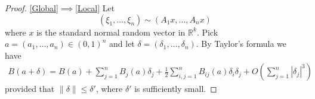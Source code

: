 \documentclass[9pt, a4paper]{amsart}
\newcommand{\R}{\mathbb{R}}
\newcommand{\1}{{\chi_{}}}%
\numberwithin{equation}{section}
\begin{document}
 




\begin{proof}		
\eqref{Global}$\implies$\eqref{Local} Let 
\begin{equation}
(\xi_1,\ldots,\xi_n)\sim (A_1x,\ldots,A_nx)
\end{equation}
where $x$ is the standard normal random vector in $\R^k$. Pick $a=(a_{1}, \ldots, a_{n})\in (0,1)^{n}$ and let $\delta = (\delta_{1}, \ldots, \delta_{n})$.  By Taylor's formula we have 
\begin{align*}
    B(a+\delta) = B(a) + \sum_{j=1}^{n} B_{j}(a) \delta_{j} + \frac{1}{2} \sum_{i,j=1}^{n}B_{ij}(a)\delta_{i}\delta_{j} + O\left( \sum_{j=1}^{n} |\delta_{j}|^{3}\right)
\end{align*}
provided that $\|\delta\| \leq \delta'$, where $\delta'$ is sufficiently small. 


\end{proof}
\end{document}

